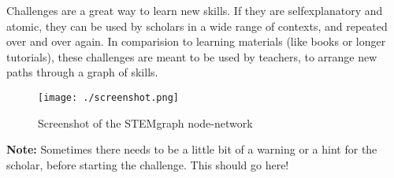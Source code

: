 \begin{challenge}


    \begin{chadescription}
        Challenges are a great way to learn new skills. 
        If they are selfexplanatory and atomic, they can be used by scholars in a wide range of contexts, and repeated over and over again.
        In comparision to learning materials (like books or longer tutorials), these challenges are meant to be used by teachers, to arrange new paths through a graph of skills.

        \begin{figure}
            \centering
            \texttt{[image: ./screenshot.png]}
            \caption{Screenshot of the STEMgraph node-network}
        \end{figure}

        \textbf{Note: }Sometimes there needs to be a little bit of a warning or a hint for the scholar, before starting the challenge. 
        This should go here!
    \end{chadescription}


\end{challenge}
